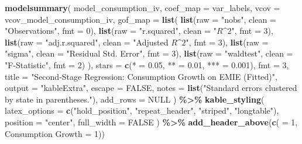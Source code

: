 \documentclass[
]{article}
\newenvironment{Shaded}{\begin{snugshade}}{\end{snugshade}}
\newcommand{\AttributeTok}[1]{\textcolor[rgb]{0.13,0.29,0.53}{#1}}
\newcommand{\ConstantTok}[1]{\textcolor[rgb]{0.56,0.35,0.01}{#1}}
\newcommand{\DecValTok}[1]{\textcolor[rgb]{0.00,0.00,0.81}{#1}}
\newcommand{\FloatTok}[1]{\textcolor[rgb]{0.00,0.00,0.81}{#1}}
\newcommand{\FunctionTok}[1]{\textcolor[rgb]{0.13,0.29,0.53}{\textbf{#1}}}
\newcommand{\NormalTok}[1]{#1}
\newcommand{\OtherTok}[1]{\textcolor[rgb]{0.56,0.35,0.01}{#1}}
\newcommand{\SpecialCharTok}[1]{\textcolor[rgb]{0.81,0.36,0.00}{\textbf{#1}}}
\newcommand{\StringTok}[1]{\textcolor[rgb]{0.31,0.60,0.02}{#1}}
\begin{document}
\begin{Shaded}
\begin{Highlighting}[]
\FunctionTok{modelsummary}\NormalTok{(}
\NormalTok{    model\_consumption\_iv, }\AttributeTok{coef\_map =}\NormalTok{ var\_labels, }\AttributeTok{vcov =}\NormalTok{ vcov\_model\_consumption\_iv,}
    \AttributeTok{gof\_map =} \FunctionTok{list}\NormalTok{(}
        \FunctionTok{list}\NormalTok{(}\AttributeTok{raw =} \StringTok{"nobs"}\NormalTok{, }\AttributeTok{clean =} \StringTok{"Observations"}\NormalTok{, }\AttributeTok{fmt =} \DecValTok{0}\NormalTok{),}
        \FunctionTok{list}\NormalTok{(}\AttributeTok{raw =} \StringTok{"r.squared"}\NormalTok{, }\AttributeTok{clean =} \StringTok{"$R\^{}2$"}\NormalTok{, }\AttributeTok{fmt =} \DecValTok{3}\NormalTok{),}
        \FunctionTok{list}\NormalTok{(}\AttributeTok{raw =} \StringTok{"adj.r.squared"}\NormalTok{, }\AttributeTok{clean =} \StringTok{"Adjusted $R\^{}2$"}\NormalTok{, }\AttributeTok{fmt =} \DecValTok{3}\NormalTok{),}
        \FunctionTok{list}\NormalTok{(}\AttributeTok{raw =} \StringTok{"sigma"}\NormalTok{, }\AttributeTok{clean =} \StringTok{"Residual Std. Error"}\NormalTok{, }\AttributeTok{fmt =} \DecValTok{3}\NormalTok{),}
        \FunctionTok{list}\NormalTok{(}\AttributeTok{raw =} \StringTok{"waldtest"}\NormalTok{, }\AttributeTok{clean =} \StringTok{"F{-}Statistic"}\NormalTok{, }\AttributeTok{fmt =} \DecValTok{2}\NormalTok{)}
\NormalTok{    ),}
    \AttributeTok{stars =} \FunctionTok{c}\NormalTok{(}\StringTok{\textasciigrave{}}\AttributeTok{*}\StringTok{\textasciigrave{}} \OtherTok{=} \FloatTok{0.05}\NormalTok{, }\StringTok{\textasciigrave{}}\AttributeTok{**}\StringTok{\textasciigrave{}} \OtherTok{=} \FloatTok{0.01}\NormalTok{, }\StringTok{\textasciigrave{}}\AttributeTok{***}\StringTok{\textasciigrave{}} \OtherTok{=} \FloatTok{0.001}\NormalTok{),}
    \AttributeTok{fmt =} \DecValTok{3}\NormalTok{, }\AttributeTok{title =} \StringTok{"Second{-}Stage Regression: Consumption Growth on EMIE (Fitted)"}\NormalTok{,}
    \AttributeTok{output =} \StringTok{"kableExtra"}\NormalTok{, }\AttributeTok{escape =} \ConstantTok{FALSE}\NormalTok{, }\AttributeTok{notes =} \FunctionTok{list}\NormalTok{(}\StringTok{"Standard errors clustered by state in parentheses."}\NormalTok{),}
    \AttributeTok{add\_rows =} \ConstantTok{NULL}
\NormalTok{) }\SpecialCharTok{\%\textgreater{}\%}
    \FunctionTok{kable\_styling}\NormalTok{(}
        \AttributeTok{latex\_options =} \FunctionTok{c}\NormalTok{(}\StringTok{"hold\_position"}\NormalTok{, }\StringTok{"repeat\_header"}\NormalTok{, }\StringTok{"striped"}\NormalTok{, }\StringTok{"longtable"}\NormalTok{),}
        \AttributeTok{position =} \StringTok{"center"}\NormalTok{, }\AttributeTok{full\_width =} \ConstantTok{FALSE}
\NormalTok{    ) }\SpecialCharTok{\%\textgreater{}\%}
    \FunctionTok{add\_header\_above}\NormalTok{(}\FunctionTok{c}\NormalTok{(}\StringTok{\textasciigrave{}}\AttributeTok{ }\StringTok{\textasciigrave{}} \OtherTok{=} \DecValTok{1}\NormalTok{, }\StringTok{\textasciigrave{}}\AttributeTok{Consumption Growth}\StringTok{\textasciigrave{}} \OtherTok{=} \DecValTok{1}\NormalTok{))}
\end{Highlighting}
\end{Shaded}
\end{document}
